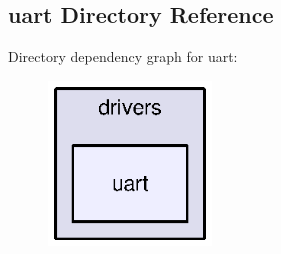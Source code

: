 \subsection{uart Directory Reference}
\label{dir_390a80247cd546be4466ff12651c09f4}
Directory dependency graph for uart\-:
\nopagebreak
\begin{figure}[H]
\begin{center}
\leavevmode
\includegraphics[width=123pt]{dir_390a80247cd546be4466ff12651c09f4_dep}
\end{center}
\end{figure}
